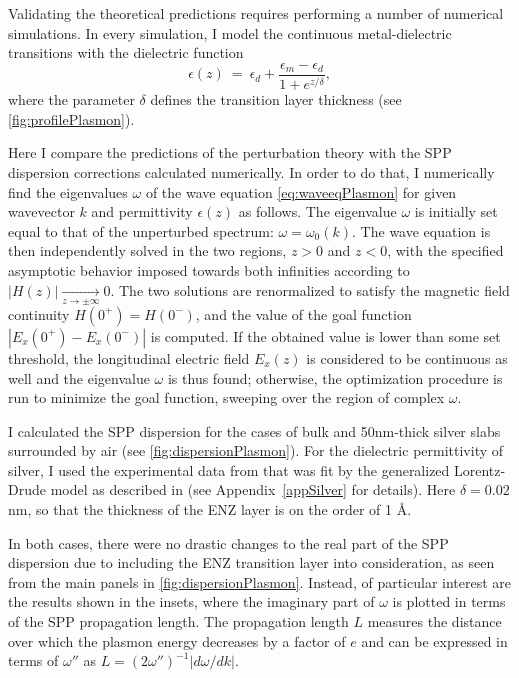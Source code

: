Validating the theoretical predictions requires performing a number of numerical simulations.
In every simulation, I model the continuous metal-dielectric transitions with the dielectric function
\begin{equation}
\label{eq:epsilonContinuous}
\epsilon(z)~=~\epsilon_d + \frac{\epsilon_m-\epsilon_d}{1+e^{z/\delta}},
\end{equation}
where the parameter $\delta$ defines the transition layer thickness (see \cref{fig:profilePlasmon}).

Here I compare the predictions of the perturbation theory with the SPP dispersion corrections calculated numerically.
In order to do that, I numerically find the eigenvalues $\omega$ of the wave equation \cref{eq:waveeqPlasmon} for given wavevector $k$ and permittivity $\epsilon(z)$ as follows.
The eigenvalue $\omega$ is initially set equal to that of the unperturbed spectrum: $\omega=\omega_0(k)$.
The wave equation is then independently solved in the two regions, $z>0$ and $z<0$, with the specified asymptotic behavior imposed towards both infinities according to $|H(z)| \underset{z\rightarrow \pm\infty}{\longrightarrow} 0$.
The two solutions are renormalized to satisfy the magnetic field continuity $H(0^{+})=H(0^{-})$, and the value of the goal function $|E_x(0^{+})-E_x(0^{-})|$ is computed.
If the obtained value is lower than some set threshold, the longitudinal electric field $E_x(z)$ is considered to be continuous as well and the eigenvalue $\omega$ is thus found; otherwise, the optimization procedure is run to minimize the goal function, sweeping over the region of complex $\omega$.

I calculated the SPP dispersion for the cases of bulk and 50nm-thick silver slabs surrounded by air (see \cref{fig:dispersionPlasmon}).
For the dielectric permittivity of silver, I used the experimental data from \cite{johnson} that was fit by the generalized Lorentz-Drude model as described in \cite{rakic} (see Appendix~\ref{appSilver} for details).
Here $\delta=0.02$ nm, so that the thickness of the ENZ layer is on the order of 1 \AA.

In both cases, there were no drastic changes to the real part of the SPP dispersion due to including the ENZ transition layer into consideration, as seen from the main panels in \cref{fig:dispersionPlasmon}.
Instead, of particular interest are the results shown in the insets, where the imaginary part of $\omega$ is plotted in terms of the SPP propagation length.
The propagation length $L$ measures the distance over which the plasmon energy decreases by a factor of $e$ and can be expressed in terms of $\omega''$ as $L=(2 \omega'')^{-1} |d\omega/dk|$.


